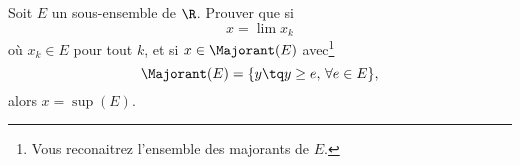 
\begin{exercice}\label{exo0005}


Soit $E$ un sous-ensemble de $\R$. Prouver que si
\[
	x = \lim x_k 
\]
où $x_k\in E$ pour tout $k$, et si $x\in \Majorant(E)$ avec\footnote{Vous reconaitrez l'ensemble des majorants de $E$.}
\begin{equation}
	\Majorant(E)=\{ y \tq y \geq e,\,\forall e\in E \},
\end{equation}
alors $x= \sup(E)$.

\end{exercice}
